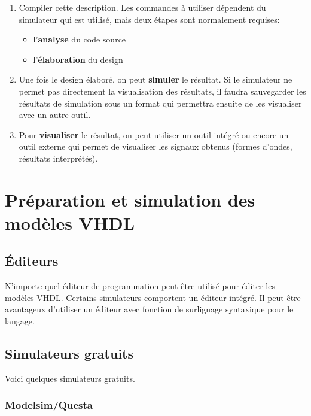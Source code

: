 \documentclass[11pt]{article}
\begin{document}
\begin{enumerate}
\item Compiler cette description. Les commandes à utiliser dépendent du
simulateur qui est utilisé, mais deux étapes sont normalement
requises:
\begin{itemize}
\item l'\textbf{analyse} du code source
\item l'\textbf{élaboration} du design
\end{itemize}

\item Une fois le design élaboré, on peut \textbf{simuler} le résultat. Si le
simulateur ne permet pas directement la visualisation des
résultats, il faudra sauvegarder les résultats de simulation sous un
format qui permettra ensuite de les visualiser avec un autre outil.

\item Pour \textbf{visualiser} le résultat, on peut utiliser un outil intégré ou encore un
outil externe qui permet de visualiser les signaux obtenus (formes d'ondes,
résultats interprétés).
\end{enumerate}

\section{Préparation et simulation des modèles VHDL}
\label{sec:org88b1a07}

\subsection{Éditeurs}
\label{sec:org8e107d9}

N'importe quel éditeur de programmation peut être utilisé pour éditer
les modèles VHDL. Certains simulateurs comportent un éditeur
intégré. Il peut être avantageux d'utiliser un éditeur avec fonction
de surlignage syntaxique pour le langage.

\subsection{Simulateurs gratuits}
\label{sec:org29fed05}

Voici quelques simulateurs gratuits. 

\subsubsection{Modelsim/Questa}
\label{sec:org071bcc0}
\end{document}
